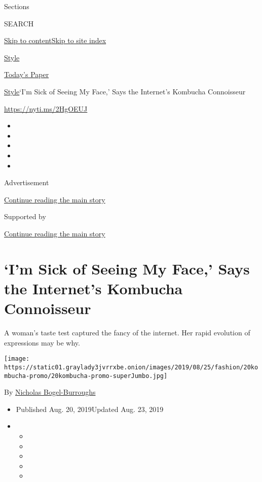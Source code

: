 Sections

SEARCH

\protect\hyperlink{site-content}{Skip to
content}\protect\hyperlink{site-index}{Skip to site index}

\href{https://www.nytimes3xbfgragh.onion/section/style}{Style}

\href{https://myaccount.nytimes3xbfgragh.onion/auth/login?response_type=cookie\&client_id=vi}{}

\href{https://www.nytimes3xbfgragh.onion/section/todayspaper}{Today's
Paper}

\href{/section/style}{Style}\textbar{}`I'm Sick of Seeing My Face,' Says
the Internet's Kombucha Connoisseur

\url{https://nyti.ms/2HgOEUJ}

\begin{itemize}
\item
\item
\item
\item
\item
\end{itemize}

Advertisement

\protect\hyperlink{after-top}{Continue reading the main story}

Supported by

\protect\hyperlink{after-sponsor}{Continue reading the main story}

\hypertarget{im-sick-of-seeing-my-face-says-the-internets-kombucha-connoisseur}{%
\section{`I'm Sick of Seeing My Face,' Says the Internet's Kombucha
Connoisseur}\label{im-sick-of-seeing-my-face-says-the-internets-kombucha-connoisseur}}

A woman's taste test captured the fancy of the internet. Her rapid
evolution of expressions may be why.

\texttt{[image: https://static01.graylady3jvrrxbe.onion/images/2019/08/25/fashion/20kombucha-promo/20kombucha-promo-superJumbo.jpg]}

By
\href{https://www.nytimes3xbfgragh.onion/by/nicholas-bogel-burroughs}{Nicholas
Bogel-Burroughs}

\begin{itemize}
\item
  Published Aug. 20, 2019Updated Aug. 23, 2019
\item
  \begin{itemize}
  \item
  \item
  \item
  \item
  \item
  \end{itemize}
\end{itemize}

